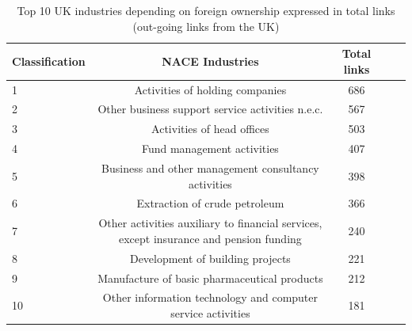 \documentclass[10pt,letterpaper]{article}
\begin{document}
\begin{table}[!ht]
\begin{adjustwidth}{-2.25in}{0in}
\caption{Top 10 UK industries depending on foreign ownership expressed in total links (out-going links from the UK)\label{tab:uk_outgoinglinks}}
\centering
\medskip
\begin{tabular}{|l|c|c|c|c|}
\hline
Classification  & NACE Industries & Total links \\ 
\hline
1 & Activities of holding companies &   686  \\
\hline
2 & Other business support service activities n.e.c.  &  567  \\
\hline
3 & Activities of head offices &  503 \\
\hline
4 &  Fund management activities &   407  \\
\hline
5 &  Business and other management consultancy activities &  398  \\
\hline
6 &  Extraction of crude petroleum &  366  \\
\hline
7 &  Other activities auxiliary to financial services, except insurance and pension funding & 240 \\
\hline
8 &  Development of building projects  & 221 \\
\hline
9 &  Manufacture of basic pharmaceutical products &  212 \\
\hline
10 &  Other information technology and computer service activities  &  181 \\
\hline
\end{tabular}
\end{adjustwidth}
\end{table}
\end{document}
